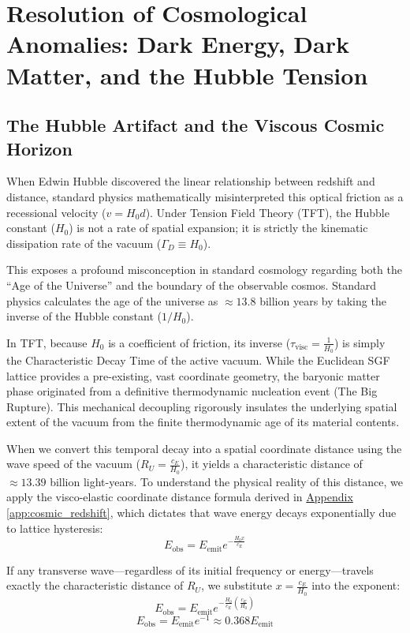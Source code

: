 \chapter{Resolution of Cosmological Anomalies: Dark Energy, Dark Matter, and the Hubble Tension}
\label{chap:cosmological_anomalies}

\section{The Hubble Artifact and the Viscous Cosmic Horizon}
\label{sec:hubble_artifact}

When Edwin Hubble discovered the linear relationship between redshift and distance, standard physics mathematically misinterpreted this optical friction as a recessional velocity ($v = H_0 d$). Under Tension Field Theory (TFT), the Hubble constant ($H_0$) is not a rate of spatial expansion; it is strictly the kinematic dissipation rate of the vacuum ($\Gamma_D \equiv H_0$).

This exposes a profound misconception in standard cosmology regarding both the ``Age of the Universe'' and the boundary of the observable cosmos. Standard physics calculates the age of the universe as $\approx 13.8$ billion years by taking the inverse of the Hubble constant ($1/H_0$).

In TFT, because $H_0$ is a coefficient of friction, its inverse ($\tau_{\text{visc}} = \frac{1}{H_0}$) is simply the Characteristic Decay Time of the active vacuum. While the Euclidean SGF lattice provides a pre-existing, vast coordinate geometry, the baryonic matter phase originated from a definitive thermodynamic nucleation event (The Big Rupture). This mechanical decoupling rigorously insulates the underlying spatial extent of the vacuum from the finite thermodynamic age of its material contents.

When we convert this temporal decay into a spatial coordinate distance using the wave speed of the vacuum ($R_U = \frac{c_E}{H_0}$), it yields a characteristic distance of $\approx 13.39$ billion light-years. To understand the physical reality of this distance, we apply the visco-elastic coordinate distance formula derived in \hyperref[app:cosmic_redshift]{Appendix \ref*{app:cosmic_redshift}}, which dictates that wave energy decays exponentially due to lattice hysteresis:
\[
E_{\text{obs}} = E_{\text{emit}} e^{-\frac{H_0 x}{c_E}}
\]

If any transverse wave---regardless of its initial frequency or energy---travels exactly the characteristic distance of $R_U$, we substitute $x = \frac{c_E}{H_0}$ into the exponent:
\[
E_{\text{obs}} = E_{\text{emit}} e^{-\frac{H_0}{c_E} \left(\frac{c_E}{H_0}\right)}
\]
\[
E_{\text{obs}} = E_{\text{emit}} e^{-1} \approx 0.368 E_{\text{emit}}
\]

